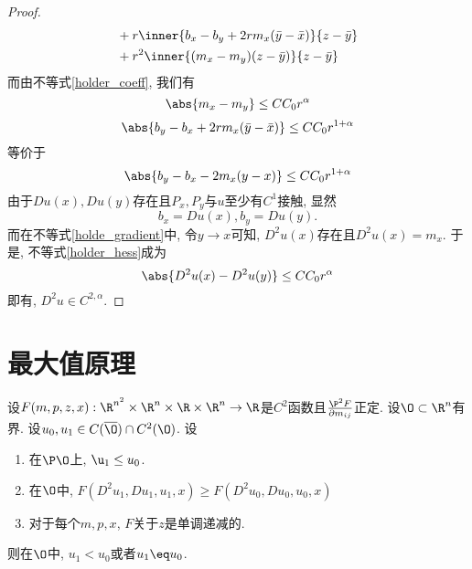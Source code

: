 \begin{proof}
\begin{equation}
\begin{split}
            &+r\inner{b_x-b_y+2rm_x(\bar{y}-\bar{x})}{z-\bar{y}} \\
            &+r^2\inner{(m_x-m_y)(z-\bar{y})}{z-\bar{y}}
        \end{split}
    \end{equation}
    而由不等式\eqref{holder_coeff}, 我们有
    \begin{equation} \label{holder_hess}
        \abs{m_x-m_y} \le CC_0r^\alpha
    \end{equation}
    \begin{equation}
        \abs{b_y-b_x+2rm_x(\bar{y}-\bar{x})} \le CC_0r^{1+\alpha}
    \end{equation}
    等价于
    \begin{equation} \label{holde_gradient}
        \abs{b_y-b_x-2m_x(y-x)} \le CC_0r^{1+\alpha}
    \end{equation}
    由于$Du(x), Du(y)$存在且$P_x,P_y$与$u$至少有$C^1$接触, 显然
    \begin{equation}
        b_x=Du(x), b_y=Du(y).
    \end{equation}
    而在不等式\eqref{holde_gradient}中, 令$y\to x$可知, $D^2u(x)$存在且$D^2u(x)=m_x$. 于是, 不等式\eqref{holder_hess}成为
    \begin{equation}
        \abs{D^2u(x)-D^2u(y)} \le CC_0r^\alpha
    \end{equation}
    即有, $D^2u \in C^{2,\alpha}$.
\end{proof}
\section{最大值原理}
\begin{theorem}
    设$F(m,p,z,x):\R^{n^2}\times \R^n \times \R \times \R^n \to \R$是$C^2$函数且$\frac{\P^2F}{\partial m_{ij}}$正定. 设$\O\subset \R^n$有界. 设$u_0, u_1\in C(\overline{\O}) \cap C^2(\O)$. 设
    \begin{enumerate}
        \item 在$\P \O$上, $\u_1 \le u_0$.
        \item 在$\O$中, $F(D^2u_1,Du_1,u_1,x) \ge F(D^2u_0,Du_0,u_0,x)$
        \item 对于每个$m,p,x$, $F$关于$z$是单调递减的.
    \end{enumerate}
    则在$\O$中, $u_1 < u_0$或者$u_1 \eq u_0$.
\end{theorem}